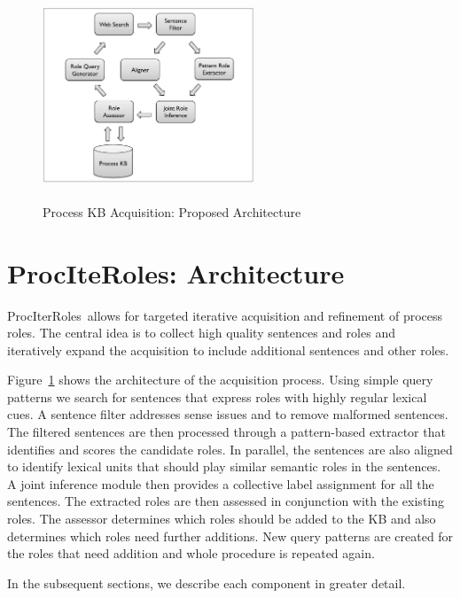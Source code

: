 
\newcommand{\sys}{ProcIterRoles}
\begin{figure}[hbt]
	\begin{center}
	\includegraphics[width=2.49in,height=2.45in]{figures/architecture} 	
	\caption{\label{fig:architecture} {Process KB Acquisition: Proposed Architecture}}
	\end{center}
\end{figure}

\section{ProcIteRoles: Architecture}

\sys\ allows for targeted iterative acquisition and refinement of process roles.
The central idea is to collect high quality sentences and roles and iteratively expand the acquisition to include
additional sentences and other roles. 

Figure~\ref{fig:architecture} shows the architecture of the acquisition process. 
Using simple query patterns we search for sentences that express roles with highly regular lexical cues. 
A sentence filter addresses sense issues and to remove malformed sentences.
The filtered sentences are then processed through a pattern-based extractor that identifies and scores the candidate roles. 
In parallel, the sentences are also aligned to identify lexical units that should play similar semantic roles in the sentences. 
A joint inference module then provides a collective label assignment for all the sentences. 
The extracted roles are then assessed in conjunction with the existing roles. 
The assessor determines which roles should be added to the KB and also determines which roles need further additions. 
New query patterns are created for the roles that need addition and whole procedure is repeated again. 

In the subsequent sections, we describe each component in greater detail.

